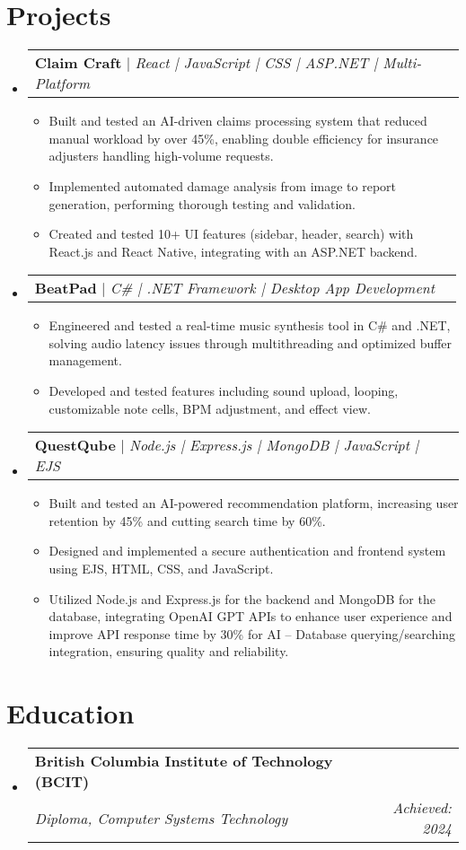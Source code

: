 \documentclass[letterpaper,11pt]{article}
\makeatletter
\newcommand{\resumeItem}[1]{
\item\small{
{#1 \vspace{-2pt}}
}
}
\newcommand{\resumeSubheading}[4]{
\vspace{-2pt}\item
\begin{tabular*}{0.97\textwidth}[t]{l@{\extracolsep{\fill}}r}
\textbf{#1} & #2 \\
\textit{\small#3} & \textit{\small #4} \\
\end{tabular*}\vspace{-7pt}
}
\newcommand{\resumeProjectHeading}[2]{
\item
\begin{tabular*}{0.97\textwidth}{l@{\extracolsep{\fill}}r}
\small#1 & #2 \\
\end{tabular*}\vspace{-7pt}
}
\newcommand{\resumeSubHeadingListStart}{\begin{itemize}[leftmargin=0.15in, label={}]}
\newcommand{\resumeSubHeadingListEnd}{\end{itemize}}
\newcommand{\resumeItemListStart}{\begin{itemize}}
\newcommand{\resumeItemListEnd}{\end{itemize}\vspace{-5pt}}
\makeatother
\begin{document}
\section{Projects}
\resumeSubHeadingListStart
\resumeProjectHeading{\textbf{Claim Craft} $|$ \emph{React | JavaScript | CSS | ASP.NET | Multi-Platform}}{}
\resumeItemListStart
\resumeItem{Built and tested an AI-driven claims processing system that reduced manual workload by over 45\%, enabling double efficiency for insurance adjusters handling high-volume requests.}
\resumeItem{Implemented automated damage analysis from image to report generation, performing thorough testing and validation.}
\resumeItem{Created and tested 10+ UI features (sidebar, header, search) with React.js and React Native, integrating with an ASP.NET backend.}
\resumeItemListEnd

\resumeProjectHeading{\textbf{BeatPad} $|$ \emph{C\# | .NET Framework | Desktop App Development}}{}
\resumeItemListStart
\resumeItem{Engineered and tested a real-time music synthesis tool in C\# and .NET, solving audio latency issues through multithreading and optimized buffer management.}
\resumeItem{Developed and tested features including sound upload, looping, customizable note cells, BPM adjustment, and effect view.}
\resumeItemListEnd

\resumeProjectHeading{\textbf{QuestQube} $|$ \emph{Node.js | Express.js | MongoDB | JavaScript | EJS}}{}
\resumeItemListStart
\resumeItem{Built and tested an AI-powered recommendation platform, increasing user retention by 45\% and cutting search time by 60\%.}
\resumeItem{Designed and implemented a secure authentication and frontend system using EJS, HTML, CSS, and JavaScript.}
\resumeItem{Utilized Node.js and Express.js for the backend and MongoDB for the database, integrating OpenAI GPT APIs to enhance user experience and improve API response time by 30\% for AI – Database querying/searching integration, ensuring quality and reliability.}
\resumeItemListEnd
\resumeSubHeadingListEnd

\section{Education}
\resumeSubHeadingListStart
\resumeSubheading{British Columbia Institute of Technology (BCIT)}{}{Diploma, Computer Systems Technology}{Achieved: 2024}
\resumeSubHeadingListEnd
\end{document}
